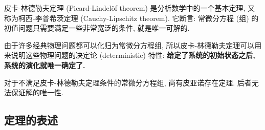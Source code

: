 
皮卡-林德勒夫定理 (Picard-Lindelöf theorem) 是分析数学中的一个基本定理, 又称为柯西-李普希茨定理 (Cauchy-Lipschitz theorem). 它断言: 常微分方程 (组) 的初值问题只需要满足一些非常宽泛的条件, 就是唯一可解的. 

由于许多经典物理问题都可以化归为常微分方程组, 所以皮卡-林德勒夫定理可以用来说明这些物理问题的决定论 (deterministic) 特性: \textbf{给定了系统的初始状态之后, 系统的演化就唯一确定了.}

对于不满足皮卡-林德勒夫定理条件的常微分方程组, 尚有皮亚诺存在定理. 后者无法保证解的唯一性.

\subsection{定理的表述}
